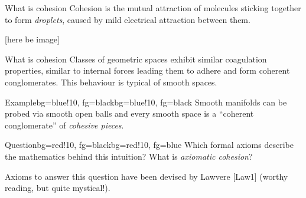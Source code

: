 \documentclass[presentation]{beamer}
\begin{document}
\begin{frame}{What is cohesion}%
	Cohesion is the mutual attraction of molecules sticking together to form \emph{droplets}, caused by mild electrical attraction between them.
  \onslide<+->
  
  [here be image]
\end{frame}
\begin{frame}{What is cohesion}%
	\onslide<+->
  Classes of geometric spaces exhibit similar coagulation properties, \onslide<+->similar to internal forces leading them to adhere and form \alert{coherent conglomerates}. \onslide<+->This behaviour is typical of \alert{smooth spaces}.%

	\medskip

	\onslide<+->\begin{variableblock}{Example}{bg=blue!10, fg=black}{bg=blue!10, fg=black}
		\alert{Smooth manifolds} can be probed via smooth open balls and every smooth space is a ``coherent conglomerate'' of \emph{cohesive pieces}.
	\end{variableblock}
	\vspace*{\fill}
	\onslide<+->\begin{variableblock}{Question}{bg=red!10, fg=black}{bg=red!10, fg=blue}
		Which formal axioms describe the mathematics behind this intuition? What is \emph{axiomatic cohesion}?
	\end{variableblock}

	\vspace*{\fill}
	Axioms to answer this question have been devised by Lawvere [Law1] (worthy reading, but quite mystical!).
\end{frame}
%
%
%
%
%
%
%
%
%
\end{document}
